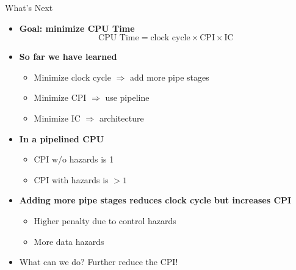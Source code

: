\documentclass[aspectratio=169,12pt]{beamer}
\begin{document}
\begin{frame}{What's Next}
  \begin{itemize}
    \item \textbf{Goal: minimize CPU Time}
    \begin{equation*}
      \text{CPU Time} = \text{clock cycle} \times \text{CPI} \times \text{IC}
    \end{equation*}
    
    \item \textbf{So far we have learned}
    \begin{itemize}
      \item Minimize clock cycle $\Rightarrow$ add more pipe stages
      \item Minimize CPI $\Rightarrow$ use pipeline
      \item Minimize IC $\Rightarrow$ architecture
    \end{itemize}
    
    \item \textbf{In a pipelined CPU}
    \begin{itemize}
      \item CPI w/o hazards is 1
      \item CPI with hazards is $> 1$
    \end{itemize}
    
    \item \textbf{Adding more pipe stages reduces clock cycle but increases CPI}
    \begin{itemize}
      \item Higher penalty due to control hazards
      \item More data hazards
    \end{itemize}
    
    \item \alert{What can we do? Further reduce the CPI!}
  \end{itemize}
\end{frame}
\end{document}
